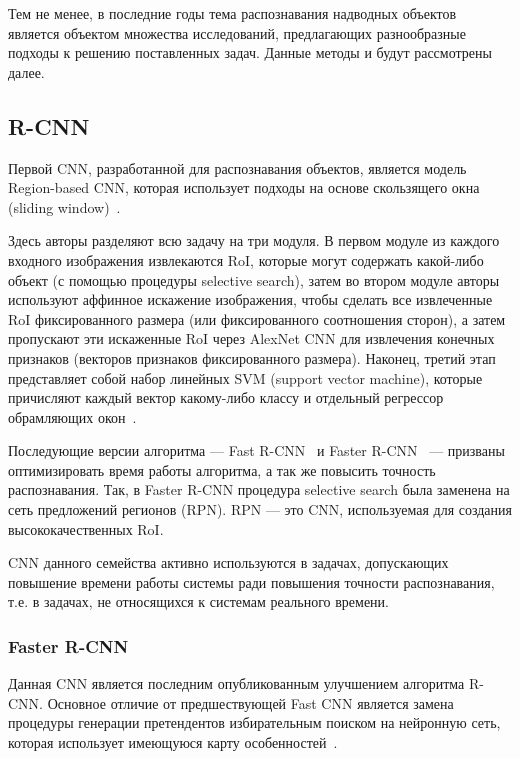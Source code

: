 Тем не менее, в последние годы тема распознавания надводных объектов является объектом множества исследований, предлагающих разнообразные подходы к решению поставленных задач. Данные методы и будут рассмотрены далее.

\subsection{R-CNN}

Первой CNN, разработанной для распознавания объектов, является модель Region-based CNN, которая использует подходы на основе скользящего окна (sliding window)~\cite{r-cnn}.

Здесь авторы разделяют всю задачу на три модуля. В первом модуле из каждого входного изображения извлекаются RoI, которые могут содержать какой-либо объект (с помощью процедуры selective search), затем во втором модуле авторы используют аффинное искажение изображения, чтобы сделать все извлеченные RoI фиксированного размера (или фиксированного соотношения сторон), а затем пропускают эти искаженные RoI через AlexNet CNN для извлечения конечных признаков (векторов признаков фиксированного размера). Наконец, третий этап представляет собой набор линейных SVM (support vector machine), которые причисляют каждый вектор какому-либо классу и отдельный регрессор обрамляющих окон~\cite{r-cnn}.

Последующие версии алгоритма --- Fast R-CNN~\cite{fast-r-cnn} и Faster R-CNN~\cite{faster-r-cnn} --- призваны оптимизировать время работы алгоритма, а так же повысить точность распознавания. Так, в Faster R-CNN процедура selective search была заменена на сеть предложений регионов (RPN). RPN --- это CNN, используемая для создания высококачественных RoI.

CNN данного семейства активно используются в задачах, допускающих повышение времени работы системы ради повышения точности распознавания, т.е. в задачах, не относящихся к системам реального времени.

\subsubsection{Faster R-CNN}

Данная CNN является последним опубликованным улучшением алгоритма R-CNN. Основное отличие от предшествующей Fast CNN является замена процедуры генерации претендентов избирательным поиском на нейронную сеть, которая использует имеющуюся карту особенностей~\cite{faster-r-cnn}.

